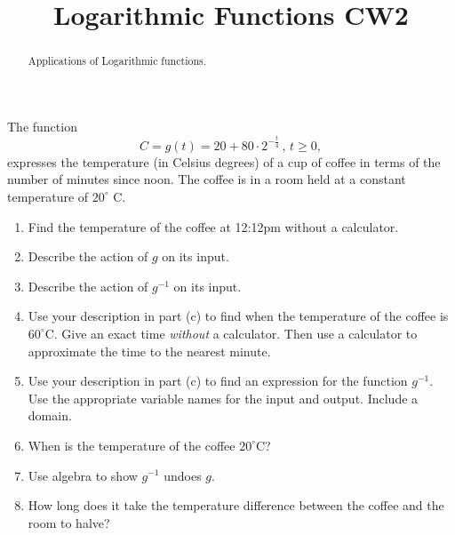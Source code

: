 \documentclass{ximera}
\title{Logarithmic Functions CW2}
\begin{document}
\begin{abstract}
Applications of Logarithmic functions.
\end{abstract}
\maketitle



\begin{question} \label{QPfrer3rdefs}
The function
\[
  C = g(t) = 20 + 80 \cdot  2^{-\frac{t}{4}} \, , \, t \geq 0,
\]
expresses the temperature (in Celsius degrees) of a cup of coffee in terms of the number of minutes since noon. The coffee is in a room held at a constant temperature of $20^\circ$ C.

\begin{enumerate}
\item Find the temperature of the coffee at 12:12pm without a calculator.

\item Describe the action of $g$ on its input.

\item Describe the action of $g^{-1}$ on its input.

\item Use your description in part (c) to find when the temperature of the coffee is $60^\circ$C. Give an exact time \emph{without} a calculator. Then use a calculator to approximate the time to the nearest minute.

\item Use your description in part (c) to find an expression for the function $g^{-1}$. Use the appropriate variable names for the input and output. Include a domain.

\item When is the temperature of the coffee $20^\circ$C?

\item Use algebra to show $g^{-1}$ undoes $g$.

\item How long does it take the temperature difference between the coffee and the room to halve?
\end{enumerate}

\end{question}
\end{document}
